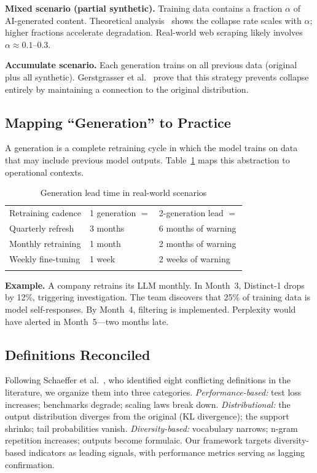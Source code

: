 \documentclass{svproc}
\newcommand{\dist}[1]{Distinct-#1}
\begin{document}
\noindent\textbf{Mixed scenario (partial synthetic).} Training data contains a
fraction $\alpha$ of AI-generated content. Theoretical
analysis~\cite{dohmatob2025strong} shows the collapse rate scales with $\alpha$;
higher fractions accelerate degradation. Real-world web scraping likely involves
$\alpha \approx 0.1$--$0.3$.

\noindent\textbf{Accumulate scenario.} Each generation trains on all previous data
(original plus all synthetic). Gerstgrasser et al.~\cite{gerstgrasser2024inevitable}
prove that this strategy prevents collapse entirely by maintaining a connection to
the original distribution.

\subsection{Mapping ``Generation'' to Practice}
A generation is a complete retraining cycle in which the model trains on data that
may include previous model outputs. Table~\ref{tab:leadtime} maps this abstraction
to operational contexts.

\begin{table}[t]
\centering
\caption{Generation lead time in real-world scenarios}
\label{tab:leadtime}
\begin{tabular}{lll}
\hline\noalign{\smallskip}
Retraining cadence & 1 generation $=$ & 2-generation lead $=$ \\
\noalign{\smallskip}\hline\noalign{\smallskip}
Quarterly refresh  & 3 months & 6 months of warning \\
Monthly retraining & 1 month  & 2 months of warning \\
Weekly fine-tuning & 1 week   & 2 weeks of warning  \\
\noalign{\smallskip}\hline
\end{tabular}
\end{table}

\noindent\textbf{Example.} A company retrains its LLM monthly. In Month~3,
\dist{1} drops by 12\%, triggering investigation. The team discovers that 25\% of
training data is model self-responses. By Month~4, filtering is implemented.
Perplexity would have alerted in Month~5---two months late.

\subsection{Definitions Reconciled}
Following Schaeffer et al.~\cite{schaeffer2025position}, who identified eight
conflicting definitions in the literature, we organize them into three categories.
\emph{Performance-based:} test loss increases; benchmarks degrade; scaling laws
break down. \emph{Distributional:} the output distribution diverges from the
original (KL divergence); the support shrinks; tail probabilities vanish.
\emph{Diversity-based:} vocabulary narrows; n-gram repetition increases; outputs
become formulaic. Our framework targets diversity-based indicators as leading
signals, with performance metrics serving as lagging confirmation.
\end{document}
